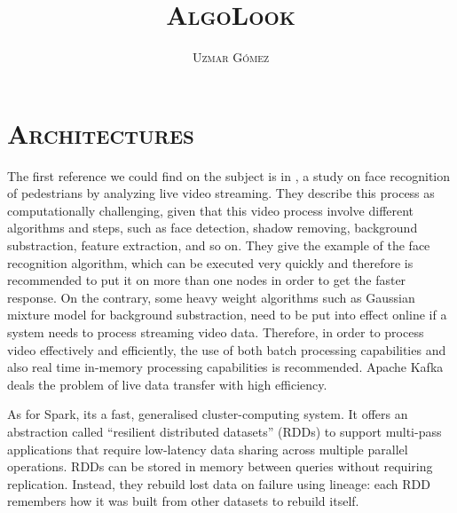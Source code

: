\documentclass[10pt,letterpaper]{article}
\title{{\scshape\huge AlgoLook}}
\author{{\scshape\Large Uzmar Gómez}}
\newcommand{\ssection}[1]{%
  \section*{\normalfont\scshape #1}}
\begin{document}
\maketitle






\ssection{Architectures}

The first reference we could find on the subject is in \cite{Pandey2018b}, a study on face recognition of pedestrians by analyzing live video streaming. They describe this process as computationally challenging, given that this video process involve different algorithms and steps, such as face detection, shadow removing, background substraction, feature extraction, and so on. They give the example of the face recognition algorithm, which can be executed very quickly and therefore is recommended to put it on more than one nodes in order to get the faster response. On the contrary, some heavy weight algorithms such as Gaussian mixture model for background substraction, need to be put into effect online if a system needs to process streaming video data. Therefore, in order to process video effectively and efficiently, the use of both batch processing capabilities and also real time in-memory processing capabilities is recommended. Apache Kafka deals the problem of live data transfer with high efficiency. 

As for Spark, its a fast, generalised cluster-computing system. It offers an abstraction called ``resilient distributed datasets'' (RDDs) to support multi-pass applications that require low-latency data sharing across multiple parallel operations. RDDs can be stored in memory between queries without requiring replication. Instead, they rebuild lost data on failure using lineage: each RDD remembers how it was built from other datasets to rebuild itself.
\end{document}
